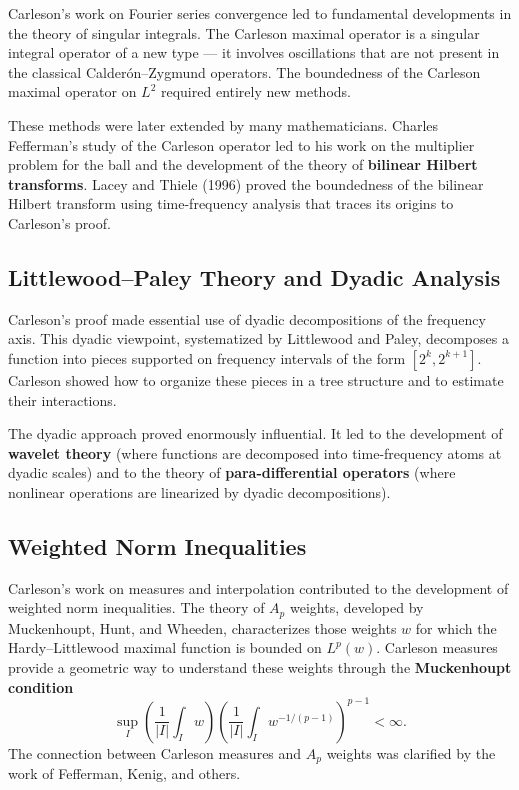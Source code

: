 Carleson's work on Fourier series convergence led to fundamental developments in the theory of singular integrals. The Carleson maximal operator is a singular integral operator of a new type --- it involves oscillations that are not present in the classical Calder\'on--Zygmund operators. The boundedness of the Carleson maximal operator on \(L^2\) required entirely new methods.

These methods were later extended by many mathematicians. Charles Fefferman's study of the Carleson operator led to his work on the multiplier problem for the ball and the development of the theory of \textbf{bilinear Hilbert transforms}. Lacey and Thiele (1996) proved the boundedness of the bilinear Hilbert transform using time-frequency analysis that traces its origins to Carleson's proof.

\subsection{Littlewood--Paley Theory and Dyadic Analysis}

Carleson's proof made essential use of dyadic decompositions of the frequency axis. This dyadic viewpoint, systematized by Littlewood and Paley, decomposes a function into pieces supported on frequency intervals of the form \([2^k, 2^{k+1}]\). Carleson showed how to organize these pieces in a tree structure and to estimate their interactions.

The dyadic approach proved enormously influential. It led to the development of \textbf{wavelet theory} (where functions are decomposed into time-frequency atoms at dyadic scales) and to the theory of \textbf{para-differential operators} (where nonlinear operations are linearized by dyadic decompositions).

\subsection{Weighted Norm Inequalities}

Carleson's work on measures and interpolation contributed to the development of weighted norm inequalities. The theory of \(A_p\) weights, developed by Muckenhoupt, Hunt, and Wheeden, characterizes those weights \(w\) for which the Hardy--Littlewood maximal function is bounded on \(L^p(w)\). Carleson measures provide a geometric way to understand these weights through the \textbf{Muckenhoupt condition}
\[
\sup_I \left(\frac{1}{|I|} \int_I w\right) \left(\frac{1}{|I|} \int_I w^{-1/(p-1)}\right)^{p-1} < \infty.
\]
The connection between Carleson measures and \(A_p\) weights was clarified by the work of Fefferman, Kenig, and others.

